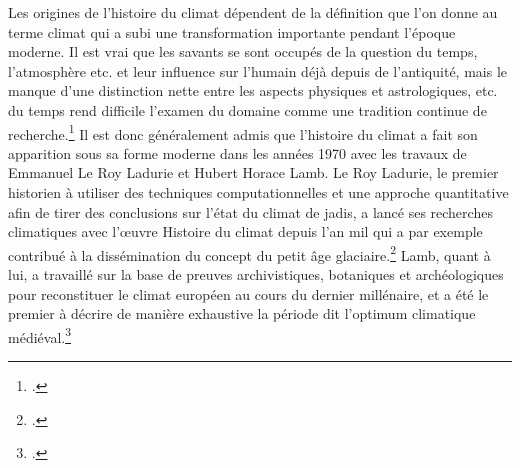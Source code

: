 \documentclass[a4paper,twoside,12pt]{article}
\begin{document}

Les origines de l'histoire du climat dépendent de la définition que l'on donne au terme \og climat \fg{} qui a subi une transformation importante pendant l'époque moderne. Il est vrai que les savants se sont occupés de la question du temps, l'atmosphère etc. et leur influence sur l'humain déjà depuis de l'antiquité, mais le manque d'une distinction nette entre les aspects physiques et astrologiques, etc. du temps rend difficile l'examen du domaine comme une tradition continue de recherche.\footcite[Pour une histoire longue de la climatologie, cf. l'excellente synthèse de Franz Mauelshagen dans][]{white_palgrave_2018} Il est donc généralement admis que
l'histoire du climat a fait son apparition sous sa forme moderne dans les années 1970 avec les travaux de Emmanuel Le Roy Ladurie et Hubert Horace Lamb. Le Roy Ladurie, le premier historien à utiliser des techniques computationnelles et une approche quantitative afin de tirer des conclusions sur l'état du climat de jadis, a lancé ses recherches climatiques avec l'œuvre \og Histoire du climat depuis l'an mil \fg{} qui a par exemple contribué à la dissémination du concept du petit âge glaciaire.\footcites{le_roy_ladurie_histoire_1967}[Ladurie a continu de s'occuper du climat après dans les années 2000 :][]{le_roy_ladurie_abrege_2007}{le_roy_ladurie_canicules_2005}{le_roy_ladurie_disettes_2006}{le_roy_ladurie_rechauffement_2009} Lamb, quant à lui, a travaillé sur la base de preuves archivistiques, botaniques et archéologiques pour reconstituer le climat européen au cours du dernier millénaire, et a été le premier à décrire de manière exhaustive la période dit l'optimum climatique médiéval.\footcite[][]{lamb_climate_2012} 
\end{document}
